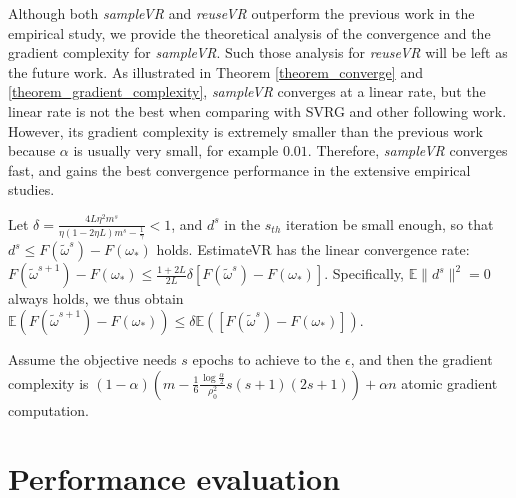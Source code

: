 \documentclass[letterpaper]{article}
\begin{document}
Although both \emph{sampleVR} and \emph{reuseVR} outperform the previous work in the empirical study, we provide the theoretical analysis of the convergence and the gradient complexity for \emph{sampleVR}. Such those analysis for \emph{reuseVR} will be left as the future work. As illustrated in Theorem \ref{theorem_converge} and \ref{theorem_gradient_complexity}, \emph{sampleVR} converges at a linear rate, but the linear rate is  not the best when comparing with SVRG and other following work. However, its gradient complexity is extremely smaller than the previous work because $\alpha$ is usually very small, for example $0.01$. Therefore, \emph{sampleVR} converges fast, and gains the best convergence performance in the extensive empirical studies.


\begin{Theorem}
\label{theorem_converge}
Let  $\delta = \frac{4 L \eta^2 m^s}{ \eta(1-2\eta L) m^s  -  \frac{1}{\gamma}    }     <1$, and $d^s$ in the $s_{th}$ iteration be small enough, so that $d^s\le F(\tilde{\omega}^s)-F(\omega_\ast)$ holds. EstimateVR has the linear convergence rate: \\
$F(\tilde{\omega}^{s+1}) - F(\omega_\ast)  \le \frac{1+2L}{2L}\delta  [F(\tilde{\omega}^s)-F(\omega_\ast)]$. Specifically, $\mathbb{E}\parallel d^s\parallel^2 = 0$ always holds, we thus obtain
$\mathbb{E}(F(\tilde{\omega}^{s+1}) - F(\omega_\ast) ) \le  \delta \mathbb{E}( [F(\tilde{\omega}^s)-F(\omega_\ast)]  )$.
\end{Theorem}


\begin{Theorem}
\label{theorem_gradient_complexity}
Assume the objective needs $s$ epochs to achieve to the $\epsilon$, and then the gradient complexity is $(1-\alpha)\left( m-\frac{1}{6} \frac{\log\frac{\alpha}{2}}{\rho_0^2} s(s+1)(2s+1) \right) + \alpha n$ atomic gradient computation.
\end{Theorem}





\section{Performance evaluation}
\label{sect_performance_evaluation}
\end{document}
